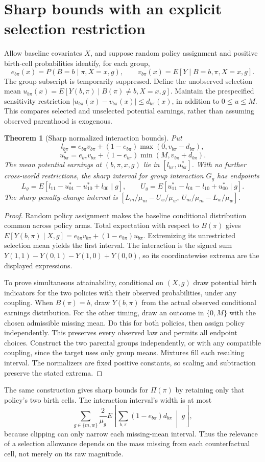 \documentclass[11pt]{article}
\newtheorem{theorem}{Theorem}
\theoremstyle{remark}
\begin{document}
\section*{Sharp bounds with an explicit selection restriction}
Allow baseline covariates $X$, and suppose random policy assignment and positive birth-cell probabilities identify, for each group,
\[
 e_{b\pi}(x)=P(B=b\mid\pi,X=x,g),\qquad
 v_{b\pi}(x)=E[Y\mid B=b,\pi,X=x,g].
\]
The group subscript is temporarily suppressed. Define the unobserved selection mean
$u_{b\pi}(x)=E[Y(b,\pi)\mid B(\pi)\ne b,X=x,g]$.
Maintain the prespecified sensitivity restriction
$|u_{b\pi}(x)-v_{b\pi}(x)|\le d_{b\pi}(x)$, in addition to $0\le u\le M$. This compares selected and unselected potential earnings, rather than assuming observed parenthood is exogenous.

\begin{theorem}[Sharp normalized interaction bounds]
Put
\[
 l_{b\pi}=e_{b\pi}v_{b\pi}+(1-e_{b\pi})\max(0,v_{b\pi}-d_{b\pi}),
\]
\[
 u^*_{b\pi}=e_{b\pi}v_{b\pi}+(1-e_{b\pi})\min(M,v_{b\pi}+d_{b\pi}).
\]
The mean potential earnings at $(b,\pi,x,g)$ lie in $[l_{b\pi},u^*_{b\pi}]$. With no further cross-world restrictions, the sharp interval for group interaction $G_g$ has endpoints
\[
 L_g=E[l_{11}-u^*_{01}-u^*_{10}+l_{00}\mid g],\qquad
 U_g=E[u^*_{11}-l_{01}-l_{10}+u^*_{00}\mid g].
\]
The sharp penalty-change interval is
$[L_m/\mu_m-U_w/\mu_w,\ U_m/\mu_m-L_w/\mu_w]$.
\end{theorem}
\begin{proof}
Random policy assignment makes the baseline conditional distribution common across policy arms. Total expectation with respect to $B(\pi)$ gives
$E[Y(b,\pi)\mid X,g]=e_{b\pi}v_{b\pi}+(1-e_{b\pi})u_{b\pi}$.
Extremizing its unrestricted selection mean yields the first interval. The interaction is the signed sum $Y(1,1)-Y(0,1)-Y(1,0)+Y(0,0)$, so its coordinatewise extrema are the displayed expressions.

To prove simultaneous attainability, conditional on $(X,g)$ draw potential birth indicators for the two policies with their observed probabilities, under any coupling. When $B(\pi)=b$, draw $Y(b,\pi)$ from the actual observed conditional earnings distribution. For the other timing, draw an outcome in $\{0,M\}$ with the chosen admissible missing mean. Do this for both policies, then assign policy independently. This preserves every observed law and permits all endpoint choices. Construct the two parental groups independently, or with any compatible coupling, since the target uses only group means. Mixtures fill each resulting interval. The normalizers are fixed positive constants, so scaling and subtraction preserve the stated extrema.
\end{proof}
The same construction gives sharp bounds for $\Pi(\pi)$ by retaining only that policy's two birth cells. The interaction interval's width is at most
\[
 \sum_{g\in\{m,w\}}\frac{2}{\mu_g}
 E\left[\sum_{b,\pi}(1-e_{b\pi})d_{b\pi}\ \middle|\ g\right],
\]
because clipping can only narrow each missing-mean interval. Thus the relevance of a selection allowance depends on the mass missing from each counterfactual cell, not merely on its raw magnitude.
\end{document}
